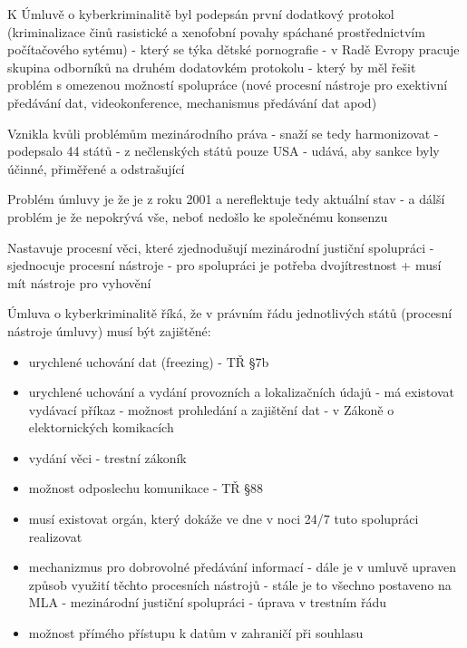 K Úmluvě o kyberkriminalitě byl podepsán první dodatkový protokol (kriminalizace činů
rasistické a xenofobní povahy spáchané prostřednictvím počítačového sytému) - který se týka
dětské pornografie - v Radě Evropy pracuje skupina odborníků na druhém dodatovkém
protokolu - který by měl řešit problém s omezenou možností spolupráce (nové procesní nástroje
pro exektivní předávání dat, videokonference, mechanismus předávání dat apod)

Vznikla kvůli problémům mezinárodního práva - snaží se tedy harmonizovat - podepsalo 44 států -
z nečlenských států pouze USA - udává, aby sankce byly účinné, přiměřené a odstrašující

Problém úmluvy je že je z roku 2001 a nereflektuje tedy aktuální stav - a dálší problém je že
nepokrývá vše, neboť nedošlo ke společnému konsenzu

Nastavuje procesní věci, které zjednodušují mezinárodní justiční spolupráci - sjednocuje procesní
nástroje - pro spolupráci je potřeba dvojítrestnost + musí mít nástroje pro vyhovění

Úmluva o kyberkriminalitě říká, že v právním řádu jednotlivých států (procesní nástroje úmluvy) musí být zajištěné:
\begin{itemize}
    \item urychlené uchování dat (freezing) - TŘ §7b
    \item  urychlené uchování a vydání provozních a lokalizačních údajů - má existovat vydávací příkaz -
    možnost prohledání a zajištění dat - v Zákoně o elektornických komikacích
    \item vydání věci - trestní zákoník
    \item  možnost odposlechu komunikace - TŘ §88
    \item musí existovat orgán, který dokáže ve dne v noci 24/7 tuto spolupráci realizovat
    \item  mechanizmus pro dobrovolné předávání informací - dále je v umluvě upraven způsob využití
    těchto procesních nástrojů - stále je to všechno postaveno na MLA - mezinárodní justiční
    spolupráci - úprava v trestním řádu
    \item možnost přímého přístupu k datům v zahraničí při souhlasu
\end{itemize}

\newpage
